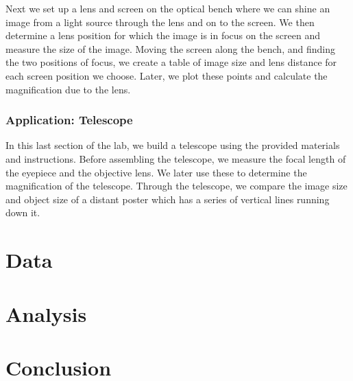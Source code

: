 \documentclass[12pt]{article}
\begin{document}
Next we set up a lens and screen on the optical bench where we can
shine an image from a light source through the lens and on to the
screen. We then determine a lens position for which the image is in
focus on the screen and measure the size of the image. Moving the
screen along the bench, and finding the two positions of focus, we
create a table of image size and lens distance for each screen
position we choose. Later, we plot these points and calculate the
magnification due to the lens. 

\subsubsection*{Application: Telescope}
In this last section of the lab, we build a telescope using the
provided materials and instructions. Before assembling the telescope,
we measure the focal length of the eyepiece and the objective lens. We
later use these to determine the magnification of the
telescope. Through the telescope, we compare the image size and object
size of a distant poster which has a series of vertical lines running
down it.

\section*{Data}
\section*{Analysis}
\section*{Conclusion}
\end{document}

